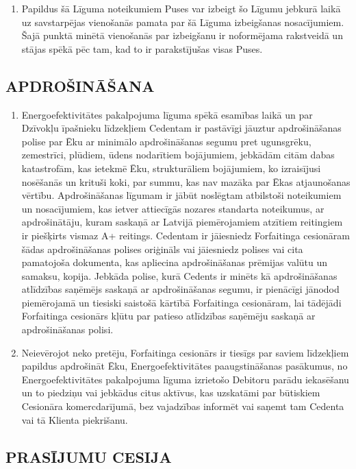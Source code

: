 \documentclass[a4paper]{article}
\begin{document}
\begin{multicols}{2}
\begin{enumerate}
  \item{Papildus šā Līguma noteikumiem Puses var izbeigt šo Līgumu jebkurā
laikā uz savstarpējas vienošanās pamata par šā Līguma izbeigšanas
nosacījumiem. Šajā punktā minētā vienošanās par izbeigšanu ir
noformējama rakstveidā un stājas spēkā pēc tam, kad to ir parakstījušas
visas Puses.}
  \end{enumerate}

  \subsection{APDROŠINĀŠANA}

  \begin{enumerate}
  \item{Energoefektivitātes pakalpojuma līguma spēkā esamības laikā un par
Dzīvokļu īpašnieku līdzekļiem Cedentam ir pastāvīgi jāuztur
apdrošināšanas polise par Ēku ar minimālo apdrošināšanas segumu
pret ugunsgrēku, zemestrīci, plūdiem, ūdens nodarītiem bojājumiem,
jebkādām citām dabas katastrofām, kas ietekmē Ēku, strukturāliem
bojājumiem, ko izraisījusi nosēšanās un krituši koki, par summu, kas nav mazāka par Ēkas atjaunošanas vērtību. Apdrošināšanas līgumam ir
jābūt noslēgtam atbilstoši noteikumiem un nosacījumiem, kas ietver
attiecīgās nozares standarta noteikumus, ar apdrošinātāju, kuram
saskaņā ar Latvijā piemērojamiem atzītiem reitingiem ir piešķirts
vismaz A+ reitings. Cedentam ir jāiesniedz Forfaitinga cesionāram šādas
apdrošināšanas polises oriģināls vai jāiesniedz polises vai cita
pamatojoša dokumenta, kas apliecina apdrošināšanas prēmijas valūtu
un samaksu, kopija. Jebkāda polise, kurā Cedents ir minēts kā
apdrošināšanas atlīdzības saņēmējs saskaņā ar apdrošināšanas
segumu, ir pienācīgi jānodod piemērojamā un tiesiski saistošā kārtībā
Forfaitinga cesionāram, lai tādējādi Forfaitinga cesionārs kļūtu par
patieso atlīdzības saņēmēju saskaņā ar apdrošināšanas polisi.}

  \item{Neievērojot neko pretēju, Forfaitinga cesionārs ir tiesīgs par saviem
līdzekļiem papildus apdrošināt Ēku, Energoefektivitātes
paaugstināšanas pasākumus, no Energoefektivitātes pakalpojuma
līguma izrietošo Debitoru parādu iekasēšanu un to piedziņu vai
jebkādus citus aktīvus, kas uzskatāmi par būtiskiem Cesionāra
komercdarījumā, bez vajadzības informēt vai saņemt tam Cedenta vai
tā Klienta piekrišanu.}
  \end{enumerate}

  \subsection{PRASĪJUMU CESIJA }


\end{multicols}
\end{document}
